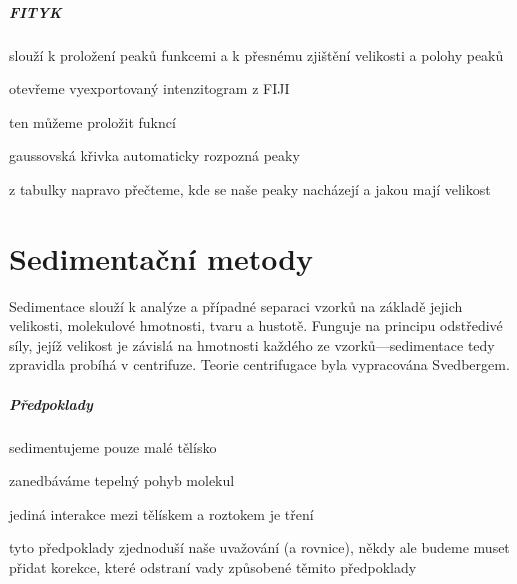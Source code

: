 \documentclass[DIV=8]{scrreprt}
\begin{document}
\paragraph{FITYK}
\begin{myItemize}[nosep]
    \item slouží k proložení peaků funkcemi a k přesnému zjištění velikosti a polohy peaků
    \item otevřeme vyexportovaný intenzitogram z FIJI
    \item ten můžeme proložit fukncí
\begin{myItemize}[nosep]
    \item gaussovská křivka automaticky rozpozná peaky
    \item z tabulky napravo přečteme, kde se naše peaky nacházejí a jakou mají velikost
\end{myItemize}

\end{myItemize}



\chapter{Sedimentační metody} \label{Sedimentační metody}


Sedimentace slouží k analýze a případné separaci vzorků na základě jejich velikosti, molekulové hmotnosti, tvaru a hustotě. Funguje na principu odstředivé síly, jejíž velikost je závislá na hmotnosti každého ze vzorků---sedimentace tedy zpravidla probíhá v centrifuze. Teorie centrifugace byla vypracována Svedbergem.

\paragraph{Předpoklady}
\begin{myItemize}[nosep]
    \item sedimentujeme pouze malé tělísko
    \item zanedbáváme tepelný pohyb molekul
    \item jediná interakce mezi tělískem a roztokem je tření
    \item tyto předpoklady zjednoduší naše uvažování (a rovnice), někdy ale budeme muset přidat korekce, které odstraní vady způsobené těmito předpoklady
\end{myItemize}
\end{document}
